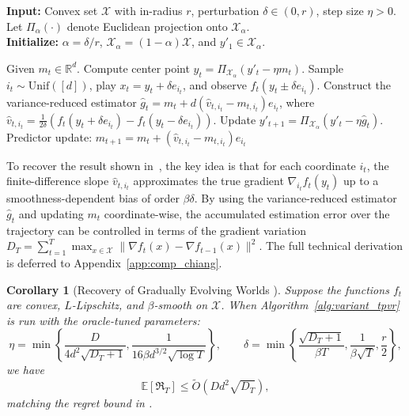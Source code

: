\documentclass[journal,onecolumn]{IEEEtran}
\newcommand{\cX}{\mathcal{X}}
\theoremstyle{plain}
\newtheorem{corollary}[theorem]{Corollary}
\theoremstyle{definition}
\theoremstyle{remark}
\newcommand{\regret}{\mathfrak{R}}
\newcommand{\tpvr}{{\sc TP-VR-Opt}}
\begin{document}
\begin{algorithm}
    [t]
    \caption{Variant of \tpvr\, with coordinate sampling}
    \label{alg:variant_tpvr}

    \textbf{Input:} Convex set $\cX$ with in-radius $r$, perturbation
    $\delta \in (0, r)$, step size $\eta > 0$. Let $\Pi_{\alpha}(\cdot)$ denote
    Euclidean projection onto $\cX_{\alpha}$. \\
    \textbf{Initialize:} $\alpha = \delta/r$, $\cX_{\alpha}= (1-\alpha)\cX$, and
    $y'_{1}\in \cX_{\alpha}$.

    \begin{algorithmic}
        [1]  
        \STATE Given
        $m_{t}\in \mathbb{R}^{d}$. 
        \STATE Compute center
        point $y_{t}= \Pi_{\cX_\alpha}(y'_{t}- \eta m_{t})$. 
        \STATE Sample
        $i_t\sim \mathrm{Unif}([d])$, play $x_{t}= y_{t}+ \delta e
        _{i_t}$, and observe $f_{t}(y_{t}\pm \delta e
        _{i_t})$. 
        \STATE Construct the variance-reduced
        estimator $\widehat{g}_{t}= m_{t}+ d(\widehat{v}_{t,i_t}-m_{t,i_t})e_{i_t}$, where
        $\widehat{v}_{t,i_t}= \frac{1}{2\delta}( f_{t}(y_{t}+ \delta e
        _{i_t})-f_{t}(y_{t}- \delta e
        _{i_t}))$. \STATE Update $y'_{t+1}= \Pi_{\cX_\alpha}(y
        '_{t}- \eta \widehat{g}_{t})$. 
        \STATE Predictor update: $m_{t+1}=m_t+(\widehat{v}_{t,i_t}-m_{t,i_t})e_{i_t}$
        \ENDFOR
    \end{algorithmic}
\end{algorithm}

To recover the result shown in~\cite{chiang2013beating}, the key idea is that for each coordinate $i_t$, the finite-difference slope $\widehat{v}_{t,i_t}$ approximates the true gradient $\nabla_{i_t} f_t(y_t)$ up to a smoothness-dependent bias of order $\beta \delta$. 
By using the variance-reduced estimator $\widehat{g}_t$ and updating $m_t$ coordinate-wise, the accumulated estimation error over the trajectory can be controlled in terms of the gradient variation $D_T = \sum_{t=1}^T \max_{x\in \cX}\|\nabla f_t(x)-\nabla f_{t-1}(x)\|^2$. 
The full technical derivation is deferred to Appendix~\ref{app:comp_chiang}.

\begin{corollary}[Recovery of Gradually Evolving Worlds \cite{chiang2013beating}]
Suppose the functions $f_{t}$ are convex, $L$-Lipschitz, and $\beta$-smooth on $\cX$. When Algorithm~\ref{alg:variant_tpvr} is run with the oracle-tuned parameters:
\begin{equation*}
    \eta=\min\left\{\frac{D}{4d^2\sqrt{D_T+1}},\frac{1}{16\beta d^{3/2}\sqrt{\log T}}\right\},\qquad 
    \delta=\min\left\{\frac{\sqrt{D_T+1}}{\beta T},\frac{1}{\beta\sqrt{T}},\frac{r}{2}\right\},
\end{equation*}
we have
\begin{equation*}
    \mathbb{E}[\regret_{T}]\le\widetilde{O}(Dd^2 \sqrt{D_T}),
\end{equation*}
matching the regret bound in \cite{chiang2013beating}.\end{corollary}
\end{document}
